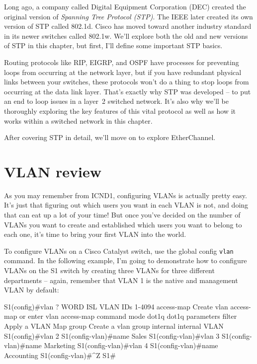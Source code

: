 \documentclass[b5paper,11pt]{memoir}
\begin{document}
Long ago, a company called Digital Equipment Corporation (DEC) created the
original version of \emph{Spanning Tree Protocol (STP)}. The IEEE later
created its own version of STP called 802.1d. Cisco has moved toward
another industry standard in its newer switches called 802.1w. We'll
explore both the old and new versions of STP in this chapter, but first,
I'll define some important STP basics.

Routing protocols like RIP, EIGRP, and OSPF have processes for
preventing loops from occurring at the network layer, but if you have
redundant physical links between your switches, these protocols won't do
a thing to stop loops from occurring at the data link layer.
That's exactly why STP was developed -- to put an end to loop issues in a layer~2 switched network.
It's also why we'll be thoroughly exploring the key features of this vital protocol as well as how it works within a
switched network in this chapter.

After covering STP in detail, we'll move on to explore EtherChannel.


\section{VLAN review}

As you may remember from ICND1, configuring VLANs is actually pretty
easy. It's just that figuring out which users you want in each VLAN is
not, and doing that can eat up a lot of your time! But once you've
decided on the number of VLANs you want to create and established which
users you want to belong to each one, it's time to bring your first VLAN
into the world.

To configure VLANs on a Cisco Catalyst switch, use the global config
\texttt{vlan} command. In the following example, I'm going to
demonstrate how to configure VLANs on the S1 switch by creating three
VLANs for three different departments -- again, remember that VLAN 1 is
the native and management VLAN by default:

\begin{cli}
S1(config)#vlan ?
  WORD        ISL VLAN IDs 1-4094
  access-map  Create vlan access-map or enter vlan access-map command mode
  dot1q       dot1q parameters
  filter      Apply a VLAN Map
  group       Create a vlan group
  internal    internal VLAN
S1(config)#vlan 2
S1(config-vlan)#name Sales
S1(config-vlan)#vlan 3
S1(config-vlan)#name Marketing
S1(config-vlan)#vlan 4
S1(config-vlan)#name Accounting
S1(config-vlan)#^Z
S1#
\end{cli}
\end{document}

